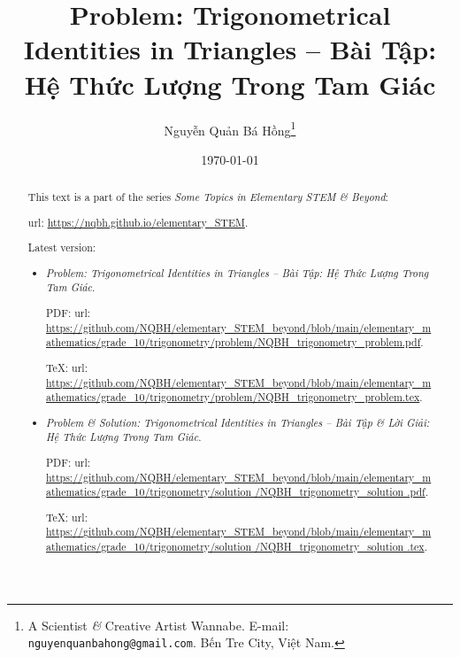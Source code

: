 \documentclass{article}
\title{Problem: Trigonometrical Identities in Triangles -- Bài Tập: Hệ Thức Lượng Trong Tam Giác}
\author{Nguyễn Quản Bá Hồng\footnote{A Scientist {\it\&} Creative Artist Wannabe. E-mail: {\tt nguyenquanbahong@gmail.com}. Bến Tre City, Việt Nam.}}
\date{\today}
\begin{document}
\maketitle
\begin{abstract}
	This text is a part of the series {\it Some Topics in Elementary STEM \& Beyond}:
	
	{\sc url}: \url{https://nqbh.github.io/elementary_STEM}.
	
	Latest version:
	\begin{itemize}
		\item {\it Problem: Trigonometrical Identities in Triangles -- Bài Tập: Hệ Thức Lượng Trong Tam Giác}.
		
		PDF: {\sc url}: \url{https://github.com/NQBH/elementary_STEM_beyond/blob/main/elementary_mathematics/grade_10/trigonometry/problem/NQBH_trigonometry_problem.pdf}.
		
		\TeX: {\sc url}: \url{https://github.com/NQBH/elementary_STEM_beyond/blob/main/elementary_mathematics/grade_10/trigonometry/problem/NQBH_trigonometry_problem.tex}.
		\item {\it Problem \& Solution: Trigonometrical Identities in Triangles -- Bài Tập \& Lời Giải: Hệ Thức Lượng Trong Tam Giác}.
		
		PDF: {\sc url}: \url{https://github.com/NQBH/elementary_STEM_beyond/blob/main/elementary_mathematics/grade_10/trigonometry/solution /NQBH_trigonometry_solution .pdf}.
		
		\TeX: {\sc url}: \url{https://github.com/NQBH/elementary_STEM_beyond/blob/main/elementary_mathematics/grade_10/trigonometry/solution /NQBH_trigonometry_solution .tex}.
	\end{itemize}
\end{abstract}
\tableofcontents

\end{document}
